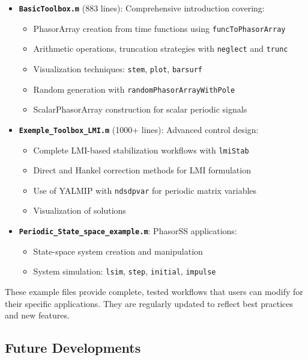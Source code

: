 \documentclass[11pt,a4paper]{article}
\begin{document}
\begin{itemize}
    \item \textbf{\texttt{BasicToolbox.m}} (883 lines): Comprehensive introduction covering:
    \begin{itemize}
        \item PhasorArray creation from time functions using \texttt{funcToPhasorArray}
        \item Arithmetic operations, truncation strategies with \texttt{neglect} and \texttt{trunc}
        \item Visualization techniques: \texttt{stem}, \texttt{plot}, \texttt{barsurf}
        \item Random generation with \texttt{randomPhasorArrayWithPole}
        \item ScalarPhasorArray construction for scalar periodic signals
    \end{itemize}
    

    \item \textbf{\texttt{Exemple\_Toolbox\_LMI.m}} (1000+ lines): Advanced control design:
    \begin{itemize}
        \item Complete LMI-based stabilization workflows with \texttt{lmiStab}
        \item Direct and Hankel correction methods for LMI formulation
        \item Use of YALMIP with \texttt{ndsdpvar} for periodic matrix variables
        \item Visualization of solutions 
    \end{itemize}


    \item \textbf{\texttt{Periodic\_State\_space\_example.m}}: PhasorSS applications:
    \begin{itemize}
        \item State-space system creation and manipulation
        \item System simulation: \texttt{lsim}, \texttt{step}, \texttt{initial}, \texttt{impulse}
    \end{itemize}
\end{itemize}


These example files provide complete, tested workflows that users can modify for their specific applications. They are regularly updated to reflect best practices and new features.

\subsection{Future Developments}
\end{document}
